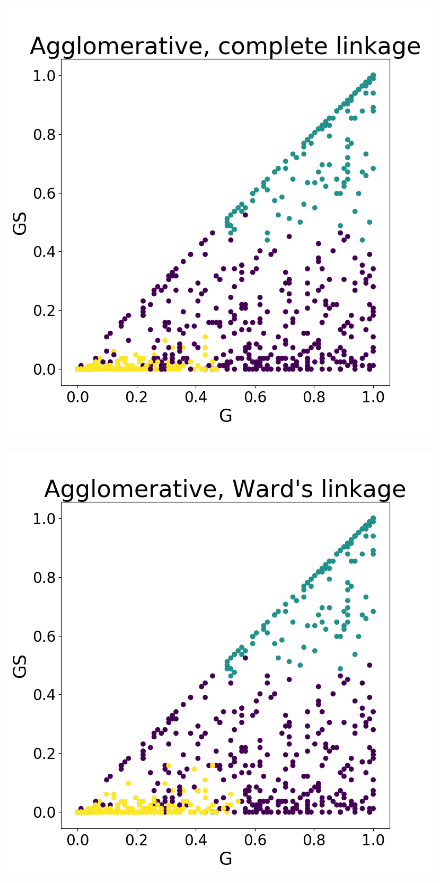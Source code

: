\documentclass[a4paper]{article}
\begin{document}
\begin{figure}
\begin{minipage}{.22\textwidth}
  \includegraphics[scale=0.14]{complete_link_g_gs_mp_scaled.png}
  \label{fig:complete_g_gs_mp_scaled}
\end{minipage}
\begin{minipage}{.22\textwidth}
  \centering
  \includegraphics[scale=0.14]{ward_link_g_gs_mp_scaled.png}

\end{minipage}
\end{figure}
\end{document}
